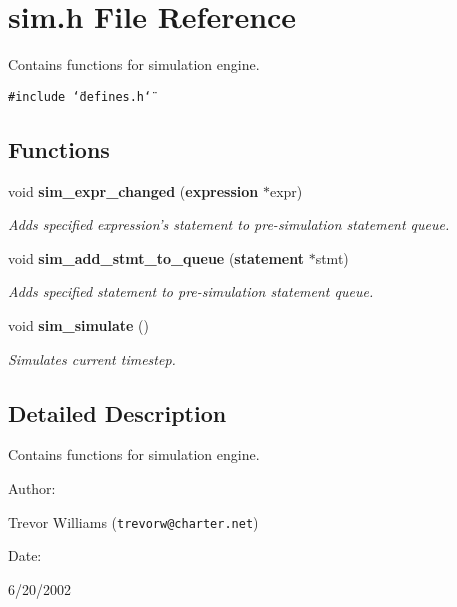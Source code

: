 \section{sim.h File Reference}
\label{sim_8h}
Contains functions for simulation engine. 


{\tt \#include \char`\"{}defines.h\char`\"{}}\par
\subsection*{Functions}
\begin{CompactItemize}
\item 
void {\bf sim\_\-expr\_\-changed} ({\bf expression} $\ast$expr)
\begin{CompactList}\small\item\em Adds specified expression's statement to pre-simulation statement queue.\item\end{CompactList}\item 
void {\bf sim\_\-add\_\-stmt\_\-to\_\-queue} ({\bf statement} $\ast$stmt)
\begin{CompactList}\small\item\em Adds specified statement to pre-simulation statement queue.\item\end{CompactList}\item 
void {\bf sim\_\-simulate} ()
\begin{CompactList}\small\item\em Simulates current timestep.\item\end{CompactList}\end{CompactItemize}


\subsection{Detailed Description}
Contains functions for simulation engine.



\begin{Desc}
\item[Author: ]\par
Trevor Williams ({\tt trevorw@charter.net}) \end{Desc}
\begin{Desc}
\item[Date: ]\par
6/20/2002\end{Desc}


